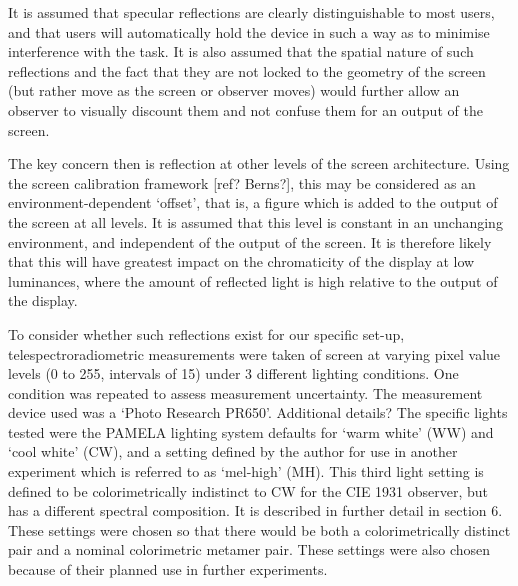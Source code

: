 It is assumed that specular reflections are clearly distinguishable to most users, and that users will automatically hold the device in such a way as to minimise interference with the task. It is also assumed that the spatial nature of such reflections and the fact that they are not locked to the geometry of the screen (but rather move as the screen or observer moves) would further allow an observer to visually discount them and not confuse them for an output of the screen.

The key concern then is reflection at other levels of the screen architecture. Using the screen calibration framework [ref? Berns?], this may be considered as an environment-dependent `offset', that is, a figure which is added to the output of the screen at all levels. It is assumed that this level is constant in an unchanging environment, and independent of the output of the screen. It is therefore likely that this will have greatest impact on the chromaticity of the display at low luminances, where the amount of reflected light is high relative to the output of the display.

To consider whether such reflections exist for our specific set-up, telespectroradiometric measurements were taken of screen at varying pixel value levels (0 to 255, intervals of 15) under 3 different lighting conditions. One condition was repeated to assess measurement uncertainty. The measurement device used was a `Photo Research PR650'. Additional details?
The specific lights tested were the PAMELA lighting system defaults for `warm white' (WW) and `cool white' (CW), and a setting defined by the author for use in another experiment which is referred to as `mel-high' (MH). This third light setting is defined to be colorimetrically indistinct to CW for the CIE 1931 observer, but has a different spectral composition. It is described in further detail in section 6. These settings were chosen so that there would be both a colorimetrically distinct pair and a nominal colorimetric metamer pair. These settings were also chosen because of their planned use in further experiments.



